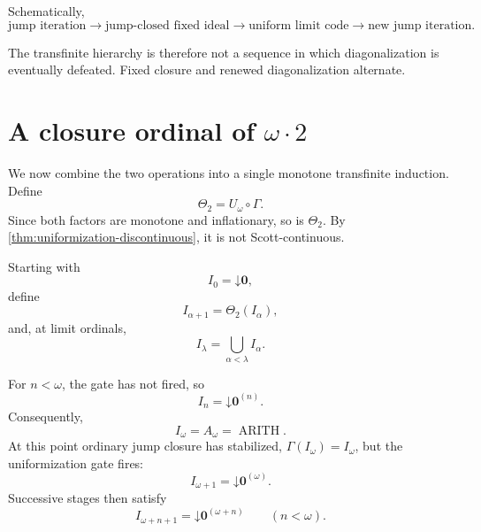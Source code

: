 \documentclass[11pt]{article}
\theoremstyle{definition}
\theoremstyle{remark}
\newcommand{\Arith}{\operatorname{ARITH}}
\newcommand{\down}{\mathord{\downarrow}}
\begin{document}
Schematically,
\begin{equation}
\boxed{
\text{jump iteration}
\longrightarrow
\text{jump-closed fixed ideal}
\longrightarrow
\text{uniform limit code}
\longrightarrow
\text{new jump iteration}.}
\label{eq:escape-schema}
\end{equation}

The transfinite hierarchy is therefore not a sequence in which diagonalization is eventually defeated. Fixed closure and renewed diagonalization alternate.

\section{A closure ordinal of \texorpdfstring{$\omega\cdot2$}{omega times 2}}

We now combine the two operations into a single monotone transfinite induction. Define
\begin{equation}
\Theta_2=U_\omega\circ\Gamma.
\label{eq:theta2}
\end{equation}
Since both factors are monotone and inflationary, so is $\Theta_2$. By \cref{thm:uniformization-discontinuous}, it is not Scott-continuous.

Starting with
\[
I_0=\down\mathbf0,
\]
define
\begin{equation}
I_{\alpha+1}=\Theta_2(I_\alpha),
\label{eq:successor-iteration}
\end{equation}
and, at limit ordinals,
\begin{equation}
I_\lambda=\bigcup_{\alpha<\lambda}I_\alpha.
\label{eq:limit-iteration}
\end{equation}

For $n<\omega$, the gate has not fired, so
\begin{equation}
I_n=\down\mathbf0^{(n)}.
\label{eq:first-block}
\end{equation}
Consequently,
\begin{equation}
I_\omega=A_\omega=\Arith.
\label{eq:stage-omega}
\end{equation}
At this point ordinary jump closure has stabilized,
$\Gamma(I_\omega)=I_\omega$, but the uniformization gate fires:
\begin{equation}
I_{\omega+1}=\down\mathbf0^{(\omega)}.
\label{eq:omega-plus-one}
\end{equation}
Successive stages then satisfy
\begin{equation}
I_{\omega+n+1}
=
\down\mathbf0^{(\omega+n)}
\qquad(n<\omega).
\label{eq:second-block}
\end{equation}
\end{document}
